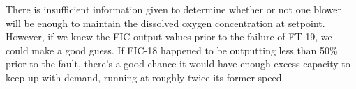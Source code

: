 \vskip 10pt

There is insufficient information given to determine whether or not one blower will be enough to maintain the dissolved oxygen concentration at setpoint.  However, if we knew the FIC output values prior to the failure of FT-19, we could make a good guess.  If FIC-18 happened to be outputting less than 50\% prior to the fault, there's a good chance it would have enough excess capacity to keep up with demand, running at roughly twice its former speed.




